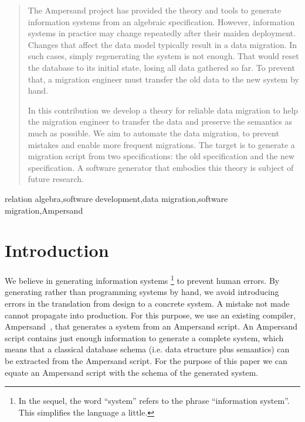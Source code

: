 \documentclass{elsarticle}
\begin{document}
\begin{abstract}
   The Ampersand project has provided the theory and tools to generate information systems from an algebraic specification.
   However, information systems in practice may change repeatedly after their maiden deployment.
   Changes that affect the data model typically result in a data migration.
   In such cases, simply regenerating the system is not enough.
   That would reset the database to its initial state, losing all data gathered so far.
   To prevent that, a migration engineer must transfer the old data to the new system by hand.

   In this contribution we develop a theory for reliable data migration to help the migration engineer
   to transfer the data and preserve the semantics as much as possible.
   We aim to automate the data migration,
   to prevent mistakes and enable more frequent migrations.
   The target is to generate a migration script from two specifications: the old specification and the new specification.
   A software generator that embodies this theory is subject of future research.
\end{abstract}

\begin{keyword}
relation algebra\sep software development\sep data migration\sep software migration\sep Ampersand
\end{keyword}
\maketitle

\section{Introduction}
\label{sct:Introduction}
   We believe in generating information systems%
\footnote{In the sequel, the word ``system'' refers to the phrase ``information system''. This simplifies the language a little. }
   to prevent human errors.
   By generating rather than programming systems by hand,
   we avoid introducing errors in the translation from design to a concrete system.
   A mistake not made cannot propagate into production.
   For this purpose, we use an existing compiler, Ampersand~\cite{Joosten-JLAMP2018},
   that generates a system from an Ampersand script.
   An Ampersand script contains just enough information to generate a complete system,
   which means that a classical database schema (i.e. data structure plus semantics) can be extracted from the Ampersand script.
   For the purpose of this paper we can equate an Ampersand script with the schema of the generated system.
\end{document}
